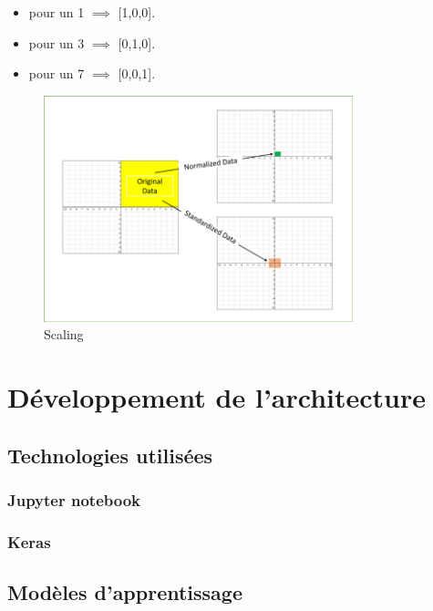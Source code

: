 \documentclass[oneside,13pt,a4paper]{report}
\begin{document}
\begin{itemize}
	\item pour un 1 $\implies$ [1,0,0].
	\item pour un 3 $\implies$ [0,1,0].
	\item pour un 7 $\implies$ [0,0,1].
\end{itemize}

\begin{figure}[h!]
	\begin{center}
		\includegraphics[width=0.8\textwidth]{img/normalisation.png}
	\end{center}
	\caption{Scaling}
\end{figure}



\chapter{Développement de l’architecture}

\section{Technologies utilisées}

\subsection{Jupyter notebook}

\subsection{Keras}

\section{Modèles d'apprentissage}
\end{document}
